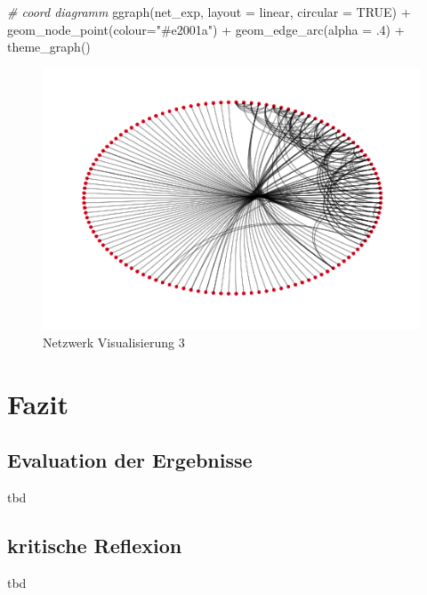 \documentclass[
  12 pt,
]{article}
\newenvironment{Shaded}{\begin{snugshade}}{\end{snugshade}}
\newcommand{\AttributeTok}[1]{\textcolor[rgb]{0.77,0.63,0.00}{#1}}
\newcommand{\CommentTok}[1]{\textcolor[rgb]{0.56,0.35,0.01}{\textit{#1}}}
\newcommand{\ConstantTok}[1]{\textcolor[rgb]{0.00,0.00,0.00}{#1}}
\newcommand{\DecValTok}[1]{\textcolor[rgb]{0.00,0.00,0.81}{#1}}
\newcommand{\FunctionTok}[1]{\textcolor[rgb]{0.00,0.00,0.00}{#1}}
\newcommand{\NormalTok}[1]{#1}
\newcommand{\SpecialCharTok}[1]{\textcolor[rgb]{0.00,0.00,0.00}{#1}}
\newcommand{\StringTok}[1]{\textcolor[rgb]{0.31,0.60,0.02}{#1}}
\begin{document}
\begin{Shaded}
\begin{Highlighting}[]
\CommentTok{\# coord diagramm}
\FunctionTok{ggraph}\NormalTok{(net\_exp, }\AttributeTok{layout =} \StringTok{\textquotesingle{}linear\textquotesingle{}}\NormalTok{, }\AttributeTok{circular =} \ConstantTok{TRUE}\NormalTok{) }\SpecialCharTok{+} 
  \FunctionTok{geom\_node\_point}\NormalTok{(}\AttributeTok{colour=}\StringTok{"\#e2001a"}\NormalTok{) }\SpecialCharTok{+}
  \FunctionTok{geom\_edge\_arc}\NormalTok{(}\AttributeTok{alpha =}\NormalTok{ .}\DecValTok{4}\NormalTok{) }\SpecialCharTok{+}
  \FunctionTok{theme\_graph}\NormalTok{()}
\end{Highlighting}
\end{Shaded}

\begin{figure}
\centering
\includegraphics{Assignment_files/figure-latex/unnamed-chunk-4-1.pdf}
\caption{Netzwerk Visualisierung 3}
\end{figure}

\newpage

\hypertarget{fazit}{%
\section{Fazit}\label{fazit}}

\hypertarget{evaluation-der-ergebnisse}{%
\subsection{Evaluation der Ergebnisse}\label{evaluation-der-ergebnisse}}

tbd

\hypertarget{kritische-reflexion}{%
\subsection{kritische Reflexion}\label{kritische-reflexion}}

tbd
\end{document}

